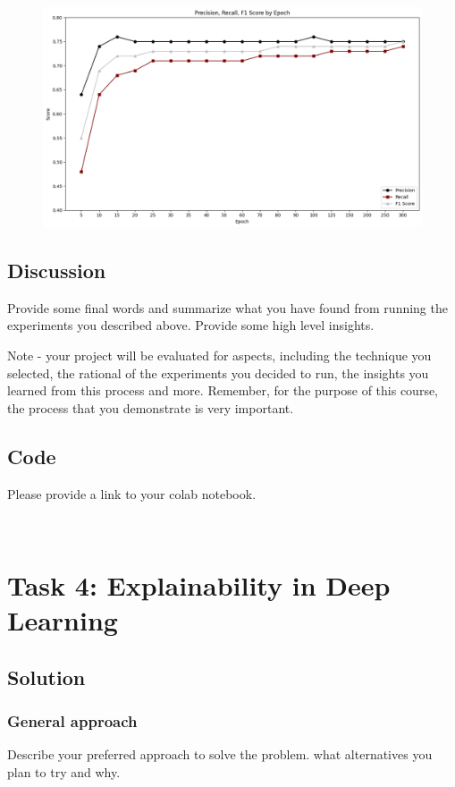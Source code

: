 \documentclass{article}
\begin{document}
\begin{figure}[H]
  \centering
  \includegraphics[width=1\linewidth]{scores_by_epoch.png}
\end{figure}

\subsection{Discussion}
Provide some final words and summarize what you have found from running the experiments you described above. Provide some high level insights.

Note - your project will be evaluated for aspects, including the technique you selected, the rational of the experiments you decided to run, the insights you learned from this process and more. Remember, for the purpose of this course, the process that you demonstrate is very  important.

\subsection{Code}

Please provide a link to your colab notebook.


\
\section{Task 4: Explainability in Deep Learning}

\subsection{Solution}
\subsubsection{General approach}
Describe your preferred approach to solve the problem. what alternatives you plan to try and why. 
\end{document}
